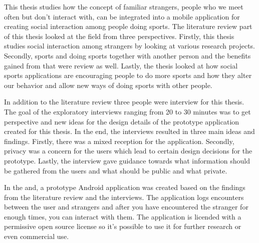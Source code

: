 %
%

\begin{enabstract}

This thesis studies how the concept of familiar strangers, people who we meet often but don't interact with, can be integrated into a mobile application for creating social interaction among people doing sports. The literature review part of this thesis looked at the field from three perspectives. Firstly, this thesis studies social interaction among strangers by looking at various research projects. Secondly, sports and doing sports together with another person and the benefits gained from that were review as well. Lastly, the thesis looked at how social sports applications are encouraging people to do more sports and how they alter our behavior and allow new ways of doing sports with other people.

In addition to the literature review three people were interview for this thesis. The goal of the exploratory interviews ranging from 20 to 30 minutes was to get perspective and new ideas for the design details of the prototype application created for this thesis. In the end, the interviews resulted in three main ideas and findings. Firstly, there was a mixed reception for the application. Secondly, privacy was a concern for the users which lead to certain design decisions for the prototype. Lastly, the interview gave guidance towards what information should be gathered from the users and what should be public and what private.

In the and, a prototype Android application was created based on the findings from the literature review and the interviews. The application logs encounters between the user and strangers and after you have encountered the stranger for enough times, you can interact with them. The application is licended with a permissive open source license so it's possible to use it for further research or even commercial use.

\end{enabstract}


